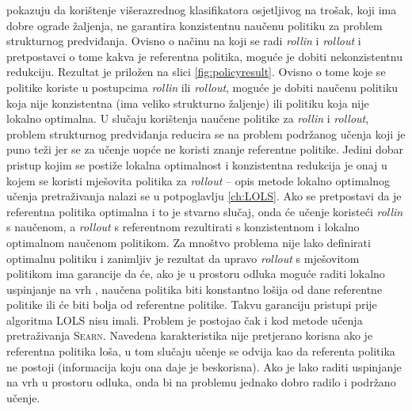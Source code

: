 \cite{daume15lols} pokazuju da korištenje višerazrednog klasifikatora
osjetljivog na trošak, koji ima dobre ograde žaljenja, ne garantira konzistentnu
naučenu politiku za problem strukturnog predviđanja. Ovisno o načinu na koji se
radi \textit{rollin} i \textit{rollout} i pretpostavci o tome kakva je
referentna politika, moguće je dobiti nekonzistentnu redukciju. Rezultat je
priložen na slici \ref{fig:policyresult}. Ovisno o tome koje se politike koriste
u postupcima \textit{rollin} ili \textit{rollout}, moguće je dobiti naučenu
politiku koja nije konzistentna (ima veliko strukturno žaljenje) ili politiku
koja nije lokalno optimalna. U slučaju korištenja naučene politike za
\textit{rollin} i \textit{rollout}, problem strukturnog predviđanja reducira se
na problem podržanog učenja koji je puno teži jer se za učenje uopće ne koristi
znanje referentne politike. Jedini dobar pristup kojim se postiže lokalna
optimalnost i konzistentna redukcija je onaj u kojem se koristi mješovita
politika za \textit{rollout} -- opis metode lokalno optimalnog učenja
pretraživanja nalazi se u potpoglavlju \ref{ch:LOLS}. Ako se pretpostavi da je
referentna politika optimalna i to je stvarno slučaj, onda će učenje koristeći
\textit{rollin} s naučenom, a \textit{rollout} s referentnom rezultirati s
konzistentnom i lokalno optimalnom naučenom politikom. Za mnoštvo problema nije
lako definirati optimalnu politiku i zanimljiv je rezultat da upravo
\textit{rollout} s mješovitom politikom ima garancije da će, ako je u prostoru
odluka moguće raditi lokalno uspinjanje na vrh ,
naučena politika biti konstantno lošija od dane referentne politike ili će biti
bolja od referentne politike. Takvu garanciju pristupi prije algoritma
\textsc{LOLS} nisu imali. Problem je postojao čak i kod metode učenja
pretraživanja \textsc{Searn}. Navedena karakteristika nije pretjerano korisna
ako je referentna politika loša, u tom slučaju učenje se odvija kao da referenta
politika ne postoji (informacija koju ona daje je beskorisna). Ako je lako
raditi uspinjanje na vrh u prostoru odluka, onda bi na problemu jednako dobro
radilo i podržano učenje.

